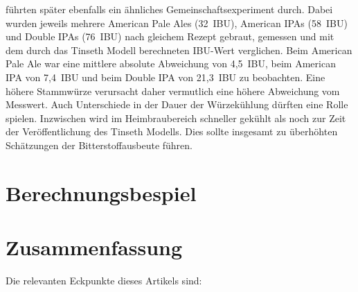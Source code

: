 \documentclass[a4paper,parskip=half]{scrartcl}
\begin{document}
\textcite{Beechum2017} führten später ebenfalls ein ähnliches Gemeinschaftsexperiment durch. Dabei wurden jeweils mehrere American Pale Ales (32~IBU), American IPAs (58~IBU) und Double IPAs (76~IBU) nach gleichem Rezept gebraut, gemessen und mit dem durch das Tinseth Modell berechneten IBU-Wert verglichen. Beim American Pale Ale war eine mittlere absolute Abweichung von 4,5~IBU, beim American IPA von 7,4~IBU und beim Double IPA von 21,3~IBU zu beobachten. Eine höhere Stammwürze verursacht daher vermutlich eine höhere Abweichung vom Messwert. Auch Unterschiede in der Dauer der Würzekühlung dürften eine Rolle spielen. Inzwischen wird im Heimbraubereich schneller gekühlt als noch zur Zeit der Veröffentlichung des Tinseth Modells. Dies sollte insgesamt zu überhöhten Schätzungen der Bitterstoffausbeute führen.

\section*{Berechnungsbespiel}

\section*{Zusammenfassung}

Die relevanten Eckpunkte dieses Artikels sind:
\end{document}
